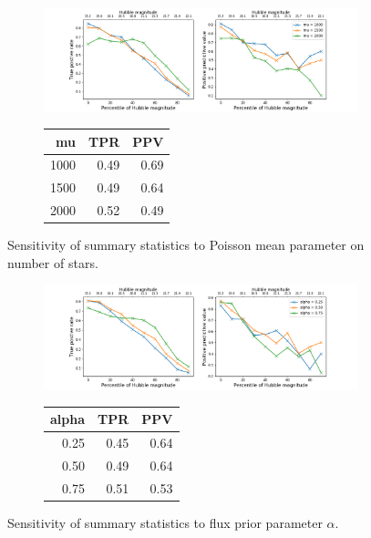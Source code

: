 
\begin{figure}[ht]
\begin{subfigure}{\textwidth}
\centering
\includegraphics[width = \textwidth]{figures/prior_mu_sensitivty.png}
\end{subfigure}
\begin{subfigure}{\textwidth}
\begin{center}
\begin{tabular}{rrr}
\toprule
     mu &   TPR &   PPV \\
\midrule
 1000&  0.49 &  0.69 \\
 1500&  0.49 &  0.64 \\
 2000 &  0.52 &  0.49 \\
\bottomrule
\end{tabular}
\par\vspace{0pt}
\end{center}
\end{subfigure}\hfill
\caption{Sensitivity of summary statistics to Poisson mean parameter on number of stars. }
\end{figure}

\begin{figure}[ht]
\begin{subfigure}{\textwidth}
\centering
\includegraphics[width = \textwidth]{figures/prior_alpha_sensitivty.png}
\end{subfigure}
\begin{subfigure}{\textwidth}
\begin{center}
\begin{tabular}{rrr}
\toprule
 alpha &   TPR &   PPV \\
\midrule
  0.25 &  0.45 &  0.64 \\
  0.50 &  0.49 &  0.64 \\
  0.75 &  0.51 &  0.53 \\
\bottomrule
\end{tabular}
\par\vspace{0pt}
\end{center}
\end{subfigure}\hfill
\caption{Sensitivity of summary statistics to flux prior parameter $\alpha$. }
\end{figure}


